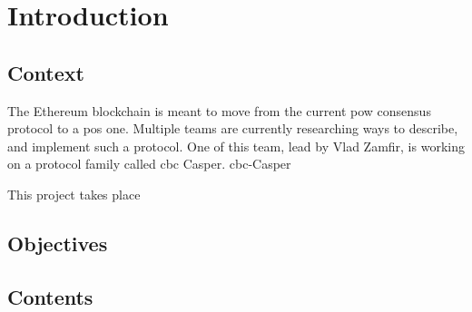 \chapter{Introduction}
\label{chap:introduction}

\section{Context}

The Ethereum blockchain is meant to move from the current \gls{pow} consensus
protocol to a \gls{pos} one. Multiple teams are currently researching ways to describe, and implement
such a protocol. One of this team, lead by Vlad Zamfir, is working on a protocol family called \gls{cbc} Casper.
\gls{cbc}-Casper

This project takes place 

\section{Objectives}


\section{Contents}



